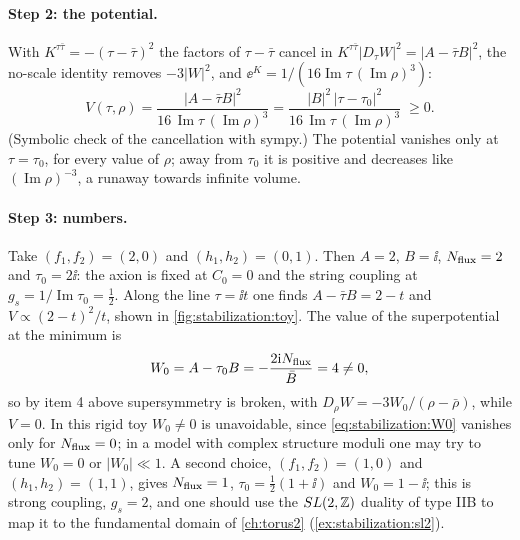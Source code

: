 \paragraph{Step 2: the potential.} With $K^{\tau\bar\tau}=-(\tau-\bar\tau)^2$ the factors of
$\tau-\bar\tau$ cancel in $K^{\tau\bar\tau}|D_\tau W|^2=|A-\bar\tau B|^2$, the no-scale identity
removes $-3|W|^2$, and $\ee^K=1/(16\operatorname{Im}\tau\,(\operatorname{Im}\rho)^3)$:
\begin{equation}\label{eq:stabilization:toyV}
 V(\tau,\rho)=\frac{|A-\bar\tau B|^2}{16\,\operatorname{Im}\tau\,(\operatorname{Im}\rho)^3}
 =\frac{|B|^2\,|\tau-\tau_0|^2}{16\,\operatorname{Im}\tau\,(\operatorname{Im}\rho)^3}\;\ge0 .
\end{equation}
(Symbolic check of the cancellation with sympy.) The potential vanishes only at $\tau=\tau_0$,
for every value of $\rho$; away from $\tau_0$ it is positive and decreases like
$(\operatorname{Im}\rho)^{-3}$, a runaway towards infinite volume.

\paragraph{Step 3: numbers.} Take $(f_1,f_2)=(2,0)$ and $(h_1,h_2)=(0,1)$. Then $A=2$,
$B=\ii$, $N_{\rm flux}=2$ and $\tau_0=2\ii$: the axion is fixed at $C_0=0$ and the string
coupling at $g_s=1/\operatorname{Im}\tau_0=\tfrac12$. Along the line $\tau=\ii t$ one finds
$A-\bar\tau B=2-t$ and $V\propto(2-t)^2/t$, shown in \cref{fig:stabilization:toy}. The value
of the superpotential at the minimum is
\begin{equation}\label{eq:stabilization:W0}
 W_0=A-\tau_0B=-\frac{2\mathrm{i} N_{\rm flux}}{\bar B}=4\neq0 ,
\end{equation}
so by item 4 above supersymmetry is broken, with $D_\rho W=-3W_0/(\rho-\bar\rho)$, while
$V=0$. In this rigid toy $W_0\neq0$ is unavoidable, since \eqref{eq:stabilization:W0} vanishes
only for $N_{\rm flux}=0$; in a model with complex structure moduli one may try to tune
$W_0=0$ or $|W_0|\ll1$. A second choice, $(f_1,f_2)=(1,0)$ and $(h_1,h_2)=(1,1)$, gives
$N_{\rm flux}=1$, $\tau_0=\tfrac12(1+\ii)$ and $W_0=1-\ii$; this is strong coupling,
$g_s=2$, and one should use the $SL(2,\mathbb{Z})$ duality of type IIB to map it to the fundamental domain
of \cref{ch:torus2} (\cref{ex:stabilization:sl2}).

